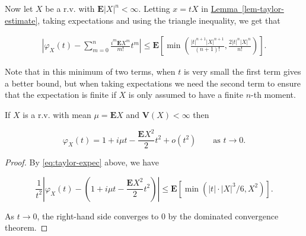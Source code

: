 \noindent Now let $X$ be a r.v. with $\mathbf{E}|X|^n < \infty$.
Letting $x=tX$ in \hyperref[lem-taylor-estimate]{Lemma~\ref*{lem-taylor-estimate}}, taking
expectations and using the triangle inequality, we get
that

\begin{align*}
\tag{16}\label{eq:taylor-expec}
\left|\varphi_X(t)-\sum_{m=0}^n \frac{i^m \mathbf{E} X^m}{m!}t^m \right| \le \mathbf{E}\left[ \min\left(
\frac{|t|^{n+1} |X|^{n+1}}{(n+1)!}, \frac{2 |t|^n |X|^n}{n!} \right) \right].
\end{align*}

\noindent Note that in this minimum of two terms, when $t$ is
very small the first term gives a better bound, but
when taking expectations we need the second term to
ensure that the expectation is finite if $X$ is only
assumed to have a finite $n$-th moment.

\begin{thm}
\label{thm-charfun-secondmoment}
If $X$ is a r.v. with mean $\mu=\mathbf{E} X$ and
$\mathbf{V}(X)<\infty$ then

\[
\varphi_X(t) = 1 + i \mu t - \frac{\mathbf{E} X^2}{2} t^2 + o(t^2) \qquad \textrm{as }t\to 0.
\]

\end{thm}

\begin{proof}
By \eqref{eq:taylor-expec} above, we have

\[
\frac{1}{t^2}\left|\varphi_X(t) - \left(1 + i \mu t - \frac{\mathbf{E} X^2}{2} t^2\right)\right| \le \mathbf{E} \left[ \min\left(|t| \cdot |X|^3/6,
X^2 \right) \right].
\]

\noindent As $t\to 0$, the right-hand side converges to 0 by
the dominated convergence theorem.
\end{proof}
